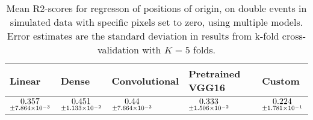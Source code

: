 \begin{table}
\centering
\caption{
Mean R2-scores for regresson of positions of origin, on double events in simulated data with specific pixels
set to zero, using multiple models. 
Error estimates are the standard deviation in results from k-fold cross-validation 
with $K=5$ folds.
}
\label{tab:regression-simulated-double-position-pixelmod-r2}
\begin{tabular}{lllll}
\toprule
                                             Linear &                                               Dense &                                      Convolutional &                                    Pretrained VGG16 &                                              Custom \\
\midrule
 $\underset{\num{+- 7.864e-03 }  }{\num{ 0.357 } }$ &  $\underset{\num{+- 1.133e-02 }  }{\num{ 0.451 } }$ &  $\underset{\num{+- 7.664e-03 }  }{\num{ 0.44 } }$ &  $\underset{\num{+- 1.506e-02 }  }{\num{ 0.333 } }$ &  $\underset{\num{+- 1.781e-01 }  }{\num{ 0.224 } }$ \\
\bottomrule
\end{tabular}
\end{table}
